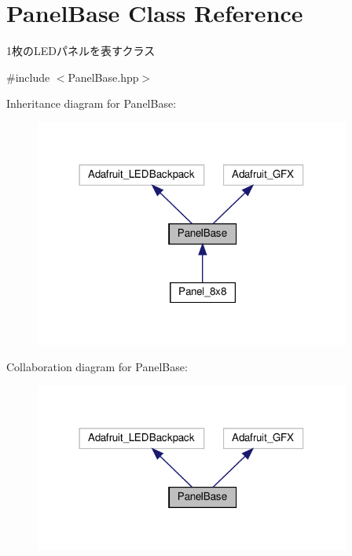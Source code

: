 \hypertarget{classPanelBase}{}\section{Panel\+Base Class Reference}
\label{classPanelBase}


1枚の\+L\+E\+Dパネルを表すクラス  




{\ttfamily \#include $<$Panel\+Base.\+hpp$>$}



Inheritance diagram for Panel\+Base\+:
\nopagebreak
\begin{figure}[H]
\begin{center}
\leavevmode
\includegraphics[width=294pt]{classPanelBase__inherit__graph}
\end{center}
\end{figure}


Collaboration diagram for Panel\+Base\+:
\nopagebreak
\begin{figure}[H]
\begin{center}
\leavevmode
\includegraphics[width=294pt]{classPanelBase__coll__graph}
\end{center}
\end{figure}
